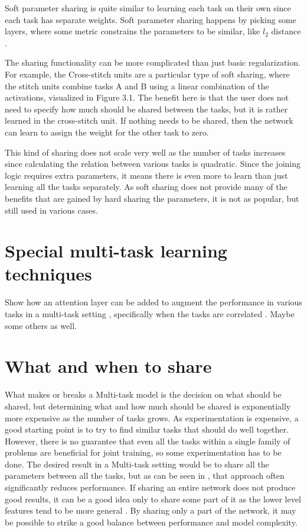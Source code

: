 Soft parameter sharing is quite similar to learning each task on their own since each task has separate weights. Soft parameter sharing happens by picking some layers, where some metric constrains the parameters to be similar, like ${l_2}$ distance \citep{ruderOverview}.

The sharing functionality can be more complicated than just basic regularization. For example, the Cross-stitch units \citep{crossStitch} are a particular type of soft sharing, where the stitch units combine tasks A and B using a linear combination of the activations, visualized in Figure 3.1. The benefit here is that the user does not need to specify how much should be shared between the tasks, but it is rather learned in the cross-stitch unit. If nothing needs to be shared, then the network can learn to assign the weight for the other task to zero.

This kind of sharing does not scale very well as the number of tasks increases since calculating the relation between various tasks is quadratic.
Since the joining logic requires extra parameters, it means there is even more to learn than just learning all the tasks separately.
As soft sharing does not provide many of the benefits that are gained by hard sharing the parameters, it is not as popular, but still used in various cases.

\section{Special multi-task learning techniques}
Show how an attention layer can be added to augment the performance in various tasks in a multi-task setting \citep{multiTaskAttention}, specifically when the tasks are correlated \citep{multiTaskWeather} \citep{weatherNet}. Maybe some others as well.

\section{What and when to share}
What makes or breaks a Multi-task model is the decision on what should be shared, but determining what and how much should be shared is exponentially more expensive as the number of tasks grows.
As experimentation is expensive, a good starting point is to try to find similar tasks that should do well together.
However, there is no guarantee that even all the tasks within a single family of problems are beneficial for joint training, so some experimentation has to be done.
The desired result in a Multi-task setting would be to share all the parameters between all the tasks, but as can be seen in \citep{uberNet}, that approach often significantly reduces performance.
If sharing an entire network does not produce good results, it can be a good idea only to share some part of it as the lower level features tend to be more general \citep{transferringMidLevelRepresentations}.
By sharing only a part of the network, it may be possible to strike a good balance between performance and model complexity.

